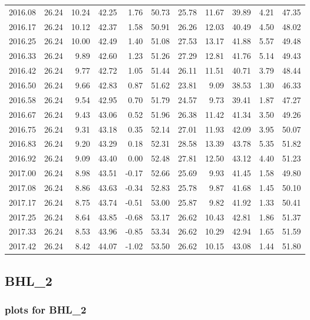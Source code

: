 \documentclass[10pt,a4paper]{article}\usepackage[]{graphicx}\usepackage[]{color}
\newcommand{\AaA}{\_}
\begin{document}
\begin{table}[ht]
\begin{tabular}{rrrrrrrrrrr}
  2016.08 & 26.24 & 10.24 & 42.25 & 1.76 & 50.73 & 25.78 & 11.67 & 39.89 & 4.21 & 47.35 \\ 
  2016.17 & 26.24 & 10.12 & 42.37 & 1.58 & 50.91 & 26.26 & 12.03 & 40.49 & 4.50 & 48.02 \\ 
  2016.25 & 26.24 & 10.00 & 42.49 & 1.40 & 51.08 & 27.53 & 13.17 & 41.88 & 5.57 & 49.48 \\ 
  2016.33 & 26.24 & 9.89 & 42.60 & 1.23 & 51.26 & 27.29 & 12.81 & 41.76 & 5.14 & 49.43 \\ 
  2016.42 & 26.24 & 9.77 & 42.72 & 1.05 & 51.44 & 26.11 & 11.51 & 40.71 & 3.79 & 48.44 \\ 
  2016.50 & 26.24 & 9.66 & 42.83 & 0.87 & 51.62 & 23.81 & 9.09 & 38.53 & 1.30 & 46.33 \\ 
  2016.58 & 26.24 & 9.54 & 42.95 & 0.70 & 51.79 & 24.57 & 9.73 & 39.41 & 1.87 & 47.27 \\ 
  2016.67 & 26.24 & 9.43 & 43.06 & 0.52 & 51.96 & 26.38 & 11.42 & 41.34 & 3.50 & 49.26 \\ 
  2016.75 & 26.24 & 9.31 & 43.18 & 0.35 & 52.14 & 27.01 & 11.93 & 42.09 & 3.95 & 50.07 \\ 
  2016.83 & 26.24 & 9.20 & 43.29 & 0.18 & 52.31 & 28.58 & 13.39 & 43.78 & 5.35 & 51.82 \\ 
  2016.92 & 26.24 & 9.09 & 43.40 & 0.00 & 52.48 & 27.81 & 12.50 & 43.12 & 4.40 & 51.23 \\ 
  2017.00 & 26.24 & 8.98 & 43.51 & -0.17 & 52.66 & 25.69 & 9.93 & 41.45 & 1.58 & 49.80 \\ 
  2017.08 & 26.24 & 8.86 & 43.63 & -0.34 & 52.83 & 25.78 & 9.87 & 41.68 & 1.45 & 50.10 \\ 
  2017.17 & 26.24 & 8.75 & 43.74 & -0.51 & 53.00 & 25.87 & 9.82 & 41.92 & 1.33 & 50.41 \\ 
  2017.25 & 26.24 & 8.64 & 43.85 & -0.68 & 53.17 & 26.62 & 10.43 & 42.81 & 1.86 & 51.37 \\ 
  2017.33 & 26.24 & 8.53 & 43.96 & -0.85 & 53.34 & 26.62 & 10.29 & 42.94 & 1.65 & 51.59 \\ 
  2017.42 & 26.24 & 8.42 & 44.07 & -1.02 & 53.50 & 26.62 & 10.15 & 43.08 & 1.44 & 51.80 \\ 
   \hline
\end{tabular}
\end{table}

\newpage
\subsection{BHL\AaA 2}
\subsubsection{plots for BHL\AaA 2}
\end{document}
